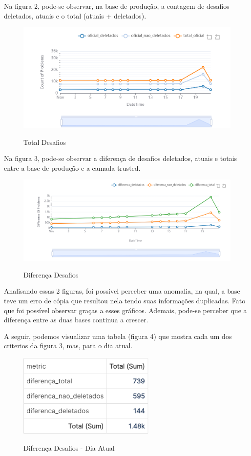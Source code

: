 Na figura 2, pode-se observar, na base de produção, a contagem de desafios deletados, atuais e o total (atuais + deletados).
    \begin{figure}[h!]
        \centering
        \caption{Total Desafios}
        \includegraphics[width = 1\linewidth]{relatorios/grupo5/figuras/result1.png}
        \label{Cont Total}
    \end{figure}
        
Na figura 3, pode-se observar a diferença de desafios deletados, atuais e totais entre a base de produção e a camada trusted.
    \begin{figure}[h!]
        \centering
        \caption{Diferença Desafios}
        \includegraphics[width = 1\linewidth]{relatorios/grupo5/figuras/result2.png}
        \label{fig:mapa}
    \end{figure}

Analisando essas 2 figuras, foi possível perceber uma anomalia, na qual, a base teve um erro de cópia que resultou nela tendo suas informações duplicadas. Fato que foi possível observar graças a esses gráficos. Ademais, pode-se perceber que a diferença entre as duas bases continua a crescer.

A seguir, podemos visualizar uma tabela (figura 4) que mostra cada um dos criterios da figura 3, mas, para o dia atual.

    \begin{figure}[h!]
        \centering
        \caption{Diferença Desafios - Dia Atual}
        \includegraphics[width = 0.4\linewidth]{relatorios/grupo5/figuras/result3.png}
        \label{fig:mapa}
    \end{figure}

